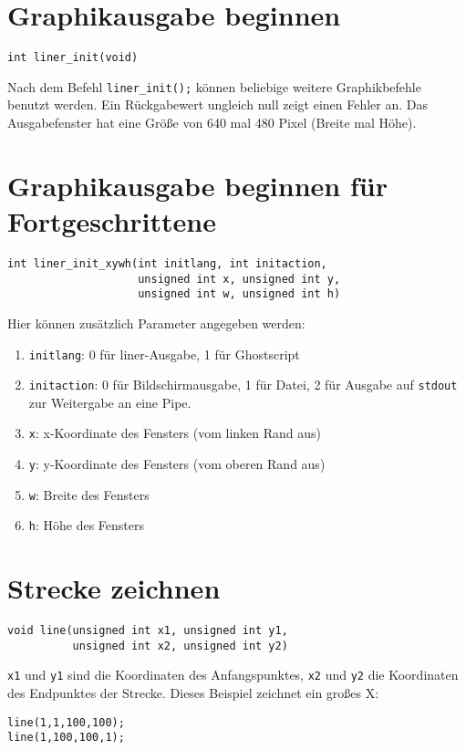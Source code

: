\documentclass{article}
\begin{document}
\section{Graphikausgabe beginnen}
\begin{verbatim}
int liner_init(void)
\end{verbatim}
Nach dem Befehl \verb#liner_init();#
k\"onnen beliebige weitere Graphikbefehle
benutzt werden. Ein R\"uckgabewert ungleich
null zeigt einen Fehler an. Das Ausgabefenster 
hat eine Gr\"o\ss{}e von 640 mal 480 Pixel (Breite mal H\"ohe).
\section{Graphikausgabe beginnen f\"ur Fortgeschrittene}
\begin{verbatim}
int liner_init_xywh(int initlang, int initaction, 
                    unsigned int x, unsigned int y,
                    unsigned int w, unsigned int h)
\end{verbatim}
Hier können zus\"atzlich Parameter angegeben werden:
\begin{enumerate}
\item \verb_initlang_: 0 für liner-Ausgabe, 1 für Ghostscript
\item \verb_initaction_: 0 für Bildschirmausgabe, 1 für Datei,
      2 für Ausgabe auf \verb_stdout_ zur Weitergabe an eine Pipe.
\item \verb_x_: x-Koordinate des Fensters (vom linken Rand aus)
\item \verb_y_: y-Koordinate des Fensters (vom oberen Rand aus)
\item \verb_w_: Breite des Fensters
\item \verb_h_: H\"ohe des Fensters
\end{enumerate}
\section{Strecke zeichnen}
\begin{verbatim}
void line(unsigned int x1, unsigned int y1, 
          unsigned int x2, unsigned int y2)
\end{verbatim}
\verb_x1_ und \verb_y1_ sind die Koordinaten des Anfangspunktes, \verb_x2_ und
\verb_y2_ die Koordinaten des Endpunktes der Strecke. 
Dieses Beispiel zeichnet ein gro\ss{}es X:
\begin{verbatim}
line(1,1,100,100);
line(1,100,100,1);
\end{verbatim}
\end{document}
